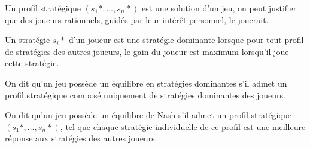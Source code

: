 \begin{definition}
	Un profil stratégique $(s_1*, …, s_n*)$ est une solution d’un jeu, on peut justifier que des joueurs rationnels, guidés par leur intérêt personnel, le jouerait.
\end{definition}

\begin{definition}
	Un stratégie $s_i*$ d’un joueur est une stratégie dominante lorsque pour tout profil de stratégies des autres joueurs, le gain du joueur est maximum lorsqu’il joue cette stratégie.
\end{definition}

\begin{definition}[Équilibre]
	On dit qu’un jeu possède un équilibre en stratégies dominantes s’il admet un profil stratégique composé uniquement de stratégies dominantes des joueurs.
\end{definition}

\begin{definition}
On dit qu’un jeu possède un équilibre de Nash s’il admet un profil stratégique $(s_1*, …,s_n*)$, tel que chaque stratégie individuelle de ce profil est une meilleure réponse aux stratégies des autres joueurs.
\end{definition}